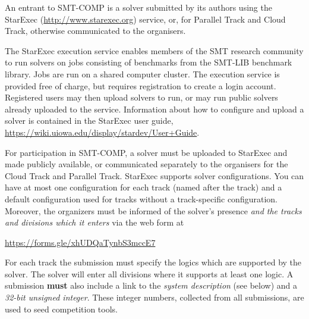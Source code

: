 \documentclass[12pt]{article}
\newcommand{\paralleltrack}{Parallel Track\xspace}
\newcommand{\cloudtrack}{Cloud Track\xspace}
\begin{document}
%
An entrant to SMT-COMP is a solver submitted by its authors using
the StarExec (\url{http://www.starexec.org}) service, or, for
\paralleltrack{} and \cloudtrack{}, otherwise communicated to the
organisers.


%
The StarExec execution
service enables members of the SMT research community to run solvers
on jobs consisting of benchmarks from the SMT-LIB benchmark library.
Jobs are run on a shared computer cluster.  The execution service is
provided free of charge, but requires registration to create a
login account.  Registered users may then upload solvers to
run, or may run public solvers already uploaded to the service.
Information about how to configure and upload a solver is contained in
the StarExec user guide,
\url{https://wiki.uiowa.edu/display/stardev/User+Guide}.

%
For participation in SMT-COMP, a solver must be uploaded to StarExec
and made publicly available, or communicated separately to the
organisers for the \cloudtrack{} and \paralleltrack{}.  StarExec
supports solver configurations.  You can have at most one configuration
for each track (named after the track) and a default configuration used
for tracks without a track-specific configuration.
Moreover, the organizers must be informed of the solver's presence
\emph{and the tracks and divisions which it enters} via the web form
at
\begin{center}
  \url{https://forms.gle/xhUDQaTynbS3mccE7}
\end{center}
For each track the submission must specify the logics which are
supported by the solver.  The solver will enter all divisions where it
supports at least one logic.  A submission \textbf{must} also include a
link to the \emph{system description} (see below) and a \emph{32-bit
  unsigned integer}.  These integer numbers, collected from all
submissions, are used to seed competition tools.
\end{document}
